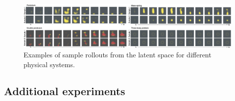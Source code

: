     
    


\begin{figure}
    \centering
    \includegraphics[width=\textwidth]{../openreview/pictures/rollout_samples/new_sampling.png}
    \caption{Examples of sample rollouts from the latent space for different physical systems.}
    \label{fig:samples}
\end{figure}

\subsection{Additional experiments} \label{sec:additional_experiments}

